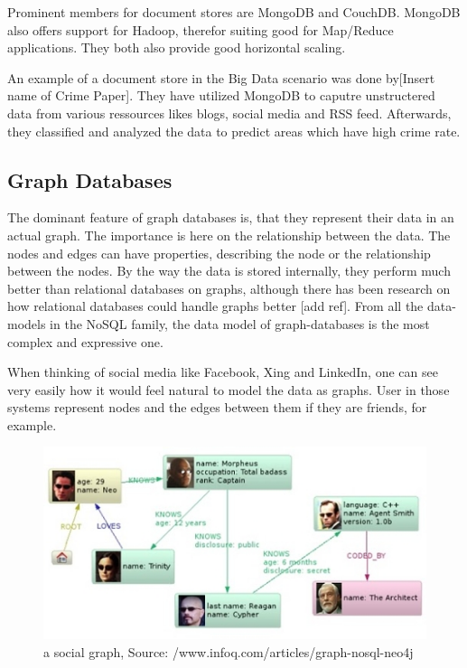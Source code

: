 \documentclass{acm_proc_article-sp}
\begin{document}
Prominent members for document stores are MongoDB and CouchDB. MongoDB also offers support for Hadoop, therefor suiting good for Map/Reduce applications. They both also provide good horizontal scaling.

An example of a document store in the Big Data scenario was done by[Insert name of Crime Paper]. They have utilized MongoDB to caputre unstructered data from various ressources likes blogs, social media and RSS feed. Afterwards, they classified and analyzed the data to predict areas which have high crime rate.

\subsection{Graph Databases}

The dominant feature of graph databases is, that they represent their data in an actual graph. The importance is here on the relationship between the data. The nodes and edges can have properties, describing the node or the relationship between the nodes. By the way the data is stored internally, they perform much better than relational databases on graphs, although there has been research on how relational databases could handle graphs better [add ref]. From all the data-models in the NoSQL family, the data model of graph-databases is the most complex and expressive one.

When thinking of social media like Facebook, Xing and LinkedIn, one can see very easily how it would feel natural to model the data as graphs. User in those systems represent nodes and the edges between them if they are friends, for example.

\begin{figure}[hbtp]
	\centering
	\includegraphics[scale=0.5]{neo4j.jpg}
	\caption{a social graph, Source: /www.infoq.com/articles/graph-nosql-neo4j}
\end{figure}
\end{document}

